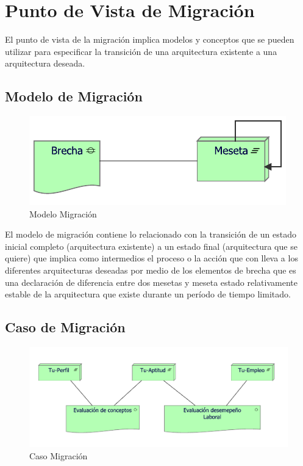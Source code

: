 \section{Punto de Vista de Migración}

El punto de vista de la migración implica modelos y conceptos que se pueden utilizar para especificar la transición de una arquitectura existente a una arquitectura deseada.

\subsection{Modelo de Migración}
\begin{figure}[h!]
	\centering
	\includegraphics[width=.9\linewidth]{imgs/modelo/Migracion.pdf}
	\caption{Modelo Migración}
\end{figure}

El modelo de migración contiene lo relacionado con la transición de un estado inicial completo (arquitectura existente) a un estado final (arquitectura que se quiere) que implica como intermedios el proceso o la acción que con lleva a los diferentes arquitecturas deseadas por medio de los elementos de brecha que es una declaración de diferencia entre dos mesetas y meseta estado relativamente estable de la arquitectura que existe durante un período de tiempo limitado.

\clearpage

\subsection{Caso  de Migración}
\begin{figure}[h!]
	\centering
	\includegraphics[width=.9\linewidth]{imgs/caso/proyecto/migracion.pdf}
	\caption{Caso Migración}
\end{figure}

